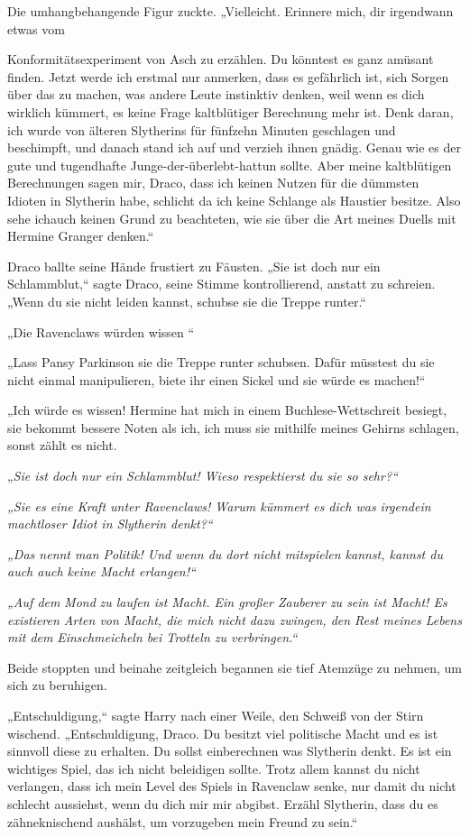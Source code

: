 {Die umhangbehangende Figur zuckte. „Vielleicht. Erinnere mich, dir irgendwann etwas vom

Konformitätsexperiment von Asch zu erzählen. Du könntest es ganz amüsant finden. Jetzt werde ich erstmal nur anmerken, dass es gefährlich ist, sich Sorgen über das zu machen, was andere Leute instinktiv denken, weil wenn es dich wirklich kümmert, es keine Frage kaltblütiger Berechnung mehr ist. Denk daran, ich wurde von älteren Slytherins für fünfzehn Minuten geschlagen und beschimpft, und danach stand ich auf und verzieh ihnen gnädig. Genau wie es der gute und tugendhafte Junge-der-überlebt-hattun sollte. Aber meine kaltblütigen Berechnungen sagen mir, Draco, dass ich keinen Nutzen für die dümmsten Idioten in Slytherin habe, schlicht da ich keine Schlange als Haustier besitze. Also sehe ichauch keinen Grund zu beachteten, wie sie über die Art meines Duells mit Hermine Granger denken.“

Draco ballte seine Hände frustiert zu Fäusten. „Sie ist doch nur ein Schlammblut,“ sagte Draco, seine Stimme kontrollierend, anstatt zu schreien. „Wenn du sie nicht leiden kannst, schubse sie die Treppe runter.“

„Die Ravenclaws würden wissen \later“

„Lass Pansy Parkinson sie die Treppe runter schubsen. Dafür müsstest du sie nicht einmal manipulieren, biete ihr einen Sickel und sie würde es machen!“

„Ich würde es wissen! Hermine hat mich in einem Buchlese-Wettschreit besiegt, sie bekommt bessere Noten als ich, ich muss sie mithilfe meines Gehirns schlagen, sonst zählt es nicht.

„\emph{Sie ist doch nur ein Schlammblut! Wieso respektierst du sie so sehr?“}

\emph{„Sie es eine Kraft unter Ravenclaws! Warum kümmert es dich was irgendein machtloser Idiot in Slytherin denkt?“}

\emph{„Das nennt man Politik! Und wenn du dort nicht mitspielen kannst, kannst du auch auch keine Macht erlangen!“}

\emph{„Auf dem} \emph{Mond} \emph{zu laufen ist Macht. Ein großer Zauberer zu sein ist Macht! Es existieren Arten von Macht, die mich nicht dazu zwingen, den Rest meines Lebens mit dem} \emph{Einschmeicheln bei Trotteln zu verbringen.“}

Beide stoppten und beinahe zeitgleich begannen sie tief Atemzüge zu nehmen, um sich zu beruhigen.

„Entschuldigung,“ sagte Harry nach einer Weile, den Schweiß von der Stirn wischend. „Entschuldigung, Draco. Du besitzt viel politische Macht und es ist sinnvoll diese zu erhalten. Du sollst einberechnen was Slytherin denkt. Es ist ein wichtiges Spiel, das ich nicht beleidigen sollte. Trotz allem kannst du nicht verlangen, dass ich mein Level des Spiels in Ravenclaw senke, nur damit du nicht schlecht aussiehst, wenn du dich mir mir abgibst. Erzähl Slytherin, dass du es zähneknischend aushälst, um vorzugeben mein Freund zu sein.“

}

